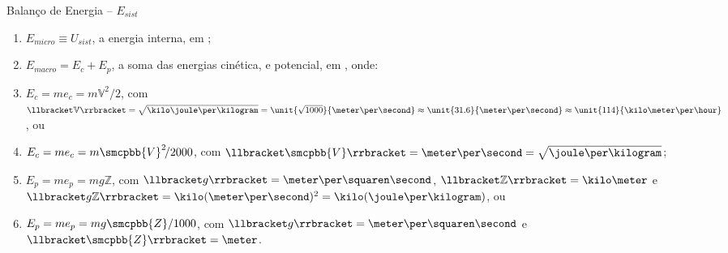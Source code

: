     \begin{frame}{Balanço de Energia -- $E_{sist}$}\vspace*{-2em}
        \\[\medskipamount]
        \begin{enumerate}
            \item<2-> $E_{micro} \equiv U_{sist}$, a \alert{energia interna}, em \kilo\joule;
                \\[\medskipamount]
            \item<3-> $E_{macro} = E_c + E_p$, a soma das energias \alert{cinética}, e
                \alert{potencial}, em \kilo\joule, onde: \\[\medskipamount]
            \item<4-> $E_c = me_c = m\mathbb{V}^2\!/2$, com $\llbracket\mathbb{V}\rrbracket =
                \sqrt{\kilo\joule\per\kilogram} = \unit{\sqrt{1000}}{\meter\per\second} \approx
                \unit{31.6}{\meter\per\second} \approx \unit{114}{\kilo\meter\per\hour}$, ou
                \\[\medskipamount]
            \item<5-> $E_c = me_c = m\smcpbb{V}^2\!/2000$, com $\llbracket\smcpbb{V}\rrbracket =
                \meter\per\second = \sqrt{\joule\per\kilogram}$; \\[\medskipamount]
            \item<6-> $E_p = me_p = mg\mathbb{Z}$, com $\llbracket g\rrbracket =
                \meter\per\squaren\second$, $\llbracket\mathbb{Z}\rrbracket = \kilo\meter$ e
                $\llbracket g\mathbb{Z}\rrbracket = \kilo(\meter\per\second)^2 =
                \kilo(\joule\per\kilogram)$, ou \\[\medskipamount]
            \item<7-> $E_p = me_p = mg\smcpbb{Z}/1000$, com $\llbracket g\rrbracket =
                \meter\per\squaren\second$ e $\llbracket\smcpbb{Z}\rrbracket = \meter$.
        \end{enumerate}
    \end{frame}

